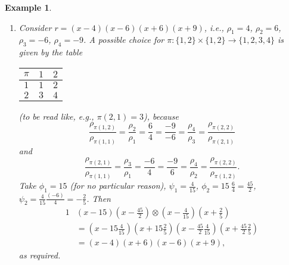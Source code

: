 \documentclass{sig-alternate}
\newtheorem{example}[theorem]{Example}
\begin{document}
\begin{example}
  \begin{enumerate}
  \item Consider $r=(x-4)(x-6)(x+6)(x+9)$, i.e., $\rho_1=4$, $\rho_2=6$, $\rho_3=-6$, $\rho_4=-9$.
    A possible choice for $\pi\colon\{1,2\}\times\{1,2\}\to\{1,2,3,4\}$ is given by the table
    \begin{center}
      \begin{tabular}{c|cc}
        $\pi$ & $1$ & $2$ \\\hline
        $1$ & $1$ & $2$ \\
        $2$ & $3$ & $4$
      \end{tabular}
    \end{center}
    (to be read like, e.g., $\pi(2,1)=3$), because
    \[
     \frac{\rho_{\pi(1,2)}}{\rho_{\pi(1,1)}} =
     \frac{\rho_2}{\rho_1} =
     \frac{6}{4} =
     \frac{-9}{-6} = 
     \frac{\rho_4}{\rho_3} =     
     \frac{\rho_{\pi(2,2)}}{\rho_{\pi(2,1)}}
    \]
    and
    \[
     \frac{\rho_{\pi(2,1)}}{\rho_{\pi(1,1)}} =
     \frac{\rho_3}{\rho_1} =
     \frac{-6}{4} =
     \frac{-9}{6} =
     \frac{\rho_4}{\rho_2} =
     \frac{\rho_{\pi(2,2)}}{\rho_{\pi(1,2)}}.
    \]
    Take $\phi_1=15$ (for no particular reason), $\psi_1=\frac4{15}$,
    $\phi_2=15\ \frac{6}{4}=\frac{45}2$, 
    $\psi_2=\frac4{15}\frac{(-6)}{4}=-\frac25$.
    Then
    \begin{alignat*}1
      &(x-15)(x-\tfrac{45}2)\otimes(x-\tfrac4{15})(x+\tfrac25)\\
      &=(x-15\tfrac{4}{15})(x+15\tfrac25)(x-\tfrac{45}2\tfrac4{15})(x+\tfrac{45}2\tfrac25)\\
      &=(x-4)(x+6)(x-6)(x+9),
    \end{alignat*}
    as required.


\end{enumerate}
\end{example}
\end{document}
